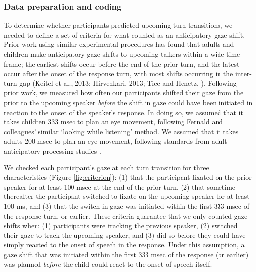 \documentclass[authoryear, 12pt]{elsarticle}
\begin{document}
\subsubsection{Data preparation and coding}
\label{sec:algorithm}

To determine whether participants predicted upcoming turn transitions, we needed to define a set of criteria for what counted as an anticipatory gaze shift. Prior work using similar experimental procedures has found that adults and children make anticipatory gaze shifts to upcoming talkers within a wide time frame; the earliest shifts occur before the end of the prior turn, and the latest occur after the onset of the response turn, with most shifts occurring in the inter-turn gap (Keitel et al., 2013; Hirvenkari, 2013; Tice and Henetz, \citeyear{TiceHenetz11}). Following prior work, we measured how often our participants shifted their gaze from the prior to the upcoming speaker \textit{before} the shift in gaze could have been initiated in reaction to the onset of the speaker's response. In doing so, we assumed that it takes children 333 msec to plan an eye movement, following Fernald and colleagues' \citeyearpar{fernald2008} similar `looking while listening' method. We assumed that it takes adults 200 msec to plan an eye movement, following standards from adult anticipatory processing studies \citep[e.g., ][]{kamide2003}.

We checked each participant's gaze at each turn transition for three characteristics (Figure \ref{fig:criterion}): (1) that the participant fixated on the prior speaker for at least 100 msec at the end of the prior turn, (2) that sometime thereafter the participant switched to fixate on the upcoming speaker for at least 100 ms, and (3) that the switch in gaze was initiated within the first 333 msec of the response turn, or earlier. These criteria guarantee that we only counted gaze shifts when: (1) participants were tracking the previous speaker, (2) switched their gaze to track the upcoming speaker, and (3) did so before they could have simply reacted to the onset of speech in the response. Under this assumption, a gaze shift that was initiated within the first 333 msec of the response (or earlier) was planned \textit{before} the child could react to the onset of speech itself. 
\end{document}
